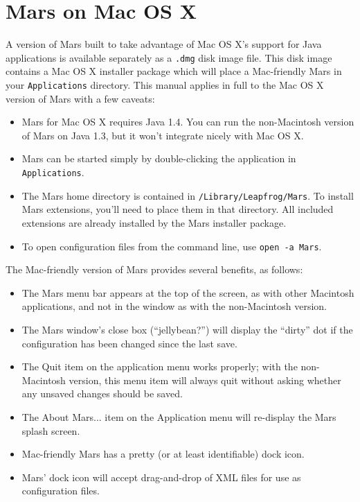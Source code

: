 \documentclass{article}
\newcommand{\filename}[1]{{\tt #1}}
\newcommand{\cmdline}[1]{{\tt #1}}
\newcommand{\guiitem}[1]{{\sf #1}}
\begin{document}
\section{Mars on Mac OS X}
\label{sec_macosx}

A version of Mars built to take advantage of Mac OS X's support for
Java applications is available separately as a \filename{.dmg} disk
image file. This disk image contains a Mac OS X installer package
which will place a Mac-friendly Mars in your
\filename{Applications} directory. This manual applies in full to the
Mac OS X version of Mars with a few caveats:

\begin{itemize}
\item Mars for Mac OS X requires Java 1.4. You can run the
  non-Macintosh version of Mars on Java 1.3, but it won't integrate
  nicely with Mac OS X.
\item Mars can be started simply by double-clicking the application in
  \filename{Applications}.
\item The Mars home directory is contained in
  \filename{/Library/Leapfrog/Mars}. To install Mars extensions,
  you'll need to place them in that directory. All included extensions
  are already installed by the Mars installer package.
\item To open configuration files from the command line, use
  \cmdline{open -a Mars}.
\end{itemize}

The Mac-friendly version of Mars provides several benefits, as follows: 

\begin{itemize}
\item The Mars menu bar appears at the top of the screen, as with
  other Macintosh applications, and not in the window as with the
  non-Macintosh version.
\item The Mars window's close box (``jellybean?'') will display the
  ``dirty'' dot if the configuration has been changed since the last
  save.
\item The \guiitem{Quit} item on the application menu works properly;
  with the non-Macintosh version, this menu item will always quit
  without asking whether any unsaved changes should be saved. 
\item The \guiitem{About Mars...} item on the Application menu will
  re-display the Mars splash screen.
\item Mac-friendly Mars has a pretty (or at least identifiable) dock icon.
\item Mars' dock icon will accept drag-and-drop of XML files for use
  as configuration files.
\end{itemize}
\end{document}
